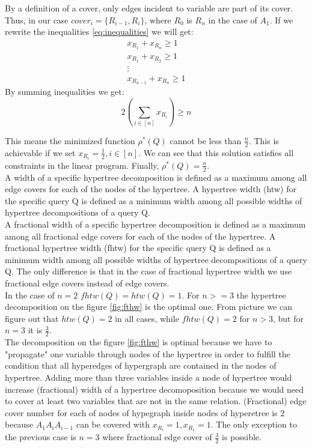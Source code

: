 \documentclass[10pt,a4paper]{article}
\begin{document}
\begin{enumerate}
\begin{enumerate}
By a definition of a cover, only edges incident  to variable are part of its cover. Thus, in our case $cover_i =\{ R_{i-1}, R_i \}$, where $R_0$ is $R_n$ in the case of $A_1$. If we rewrite the inequalities \ref{eq:inequalities} we will get:
\begin{eqnarray}
x_{R_1} +  x_{R_n} \geq 1 \nonumber \\
x_{R_1} +  x_{R_2} \geq 1\nonumber \\
\vdots \nonumber \\
x_{R_{n-1}} +  x_{R_n} \geq 1 \nonumber
\end{eqnarray}
By summing inequalities we get:
$$2\left(\sum_{i\in [n]} x_{R_i}\right) \geq n$$
\end{enumerate}
This means the minimized function $\rho^*(Q)$ cannot  be less than $\frac{n}{2}$. This is achievable if we set $x_{R_i}=\frac{1}{2}, i \in [n]$. We can see that this solution satisfies all constraints in the linear program. Finally, $\rho^*(Q)=\frac{n}{2}$. 
\\
A width of a specific hypertree decomposition is defined as a maximum among all edge covers for each of the nodes of the hypertree. A hypertree width (htw) for the specific query Q is defined as a minimum width among all possible widths of hypertree decompositions of a query Q. 
\\
A fractional width of a specific hypertree decomposition is defined as a maximum among all fractional edge covers for each of the nodes of the hypertree. A fractional hypertree width (fhtw) for the specific query Q is defined as a minimum width among all possible widths of hypertree decompositions of a query Q.
The only difference is that in the case of fractional hypertree width we use fractional edge covers instead of edge covers. \\
In the case of $n=2$ $fhtw(Q) = htw(Q) = 1$. For $n >= 3$ the hypertree decomposition on the figure \ref{fig:fthw} is the optimal one. From picture we can figure out that $htw(Q)=2$ in all cases, while $fhtw(Q)=2$ for $n>3$, but for $n=3$ it is $\frac{3}{2}$. 
\\
The decomposition on the figure \ref{fig:fthw} is optimal because we have to "propagate" one variable through nodes of the hypertree in order to fulfill the condition that all hyperedges of hypergraph are contained in the nodes of hypertree. Adding more than three variables inside a node of hypertree would increase (fractional) width of a hypertree decomoposition because we would need to cover at least two variables that are not in the same relation.  (Fractional) edge cover number for each of nodes of hypegraph inside nodes of hyperetree is $2$ because $A_1 A_iA_{i-1}$ can be covered with $x_{R_i}=1, x_{R_1}=1$. The only exception to the previous case is $n=3$ where fractional edge cover of $\frac{3}{2}$ is possible. 

\end{enumerate}
\end{document}
